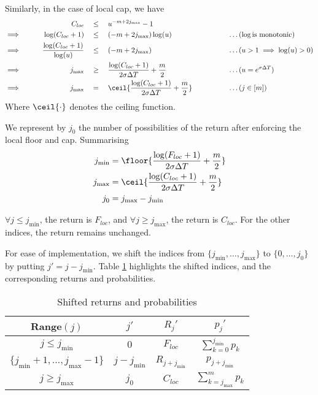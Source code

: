 Similarly, in the case of local cap, we have
\begin{alignat*}{9}
	                 &&  C_{loc}  \quad & \le \quad  u^{ -m + 2 j_{\max} } - 1 && \\
	\implies \qquad  &&  \log(C_{loc} + 1)  \quad & \le \quad  ( -m + 2 j_{\max} ) \log(u)  &&  \qquad \qquad \dots (\log \text{is monotonic}) \\
	\implies \qquad  &&  \frac{\log(C_{loc} + 1)}{\log(u)}  \quad & \le \quad  ( -m + 2 j_{\max} )  &&  \qquad \qquad \dots (u > 1 \implies \log(u) > 0) \\
	\implies \qquad  &&  j_{\max}  \quad & \ge \quad  \frac{ \log(C_{loc} + 1) }{ 2 \sigma \Delta T } + \frac{m}{2}  &&  \qquad \qquad \dots (u = e^{ \sigma \Delta T }) \\
	\implies \qquad  &&  j_{\max}  \quad & = \quad  \ceil{ \frac{ \log(C_{loc} + 1) }{ 2 \sigma \Delta T } + \frac{m}{2} }  &&  \qquad \qquad \dots (j \in [m]) \\
\end{alignat*}
Where $ \ceil{\cdot} $ denotes the ceiling function.

We represent by $ j_0 $ the number of possibilities of the return after enforcing the local floor and cap. Summarising
\begin{subequations}
	\label{eq:sp-clq-j-mix-max}
	\begin{align}
		j_{\min} &= \floor{ \frac{ \log(F_{loc} + 1) }{ 2 \sigma \Delta T } + \frac{m}{2} }  \\
		j_{\max} &= \ceil { \frac{ \log(C_{loc} + 1) }{ 2 \sigma \Delta T } + \frac{m}{2} }  \\
		j_0 &= j_{\max} - j_{\min}
	\end{align}
\end{subequations}

$ \forall j \le j_{\min} $, the return is $ F_{loc} $, and $ \forall j \ge j_{\max} $, the return is $ C_{loc} $. For the other indices, the return remains unchanged.

For ease of implementation, we shift the indices from $ \{ j_{\min}, \dots, j_{\max} \} $ to $ \{ 0, \dots, j_0 \} $ by putting $ j' = j - j_{\min} $. Table \ref{tab:sp-clq-shift} highlights the shifted indices, and the corresponding returns and probabilities.
\begin{table}[h]
	\label{tab:sp-clq-shift}
	\centering
	\caption{Shifted returns and probabilities}
	\begin{tabular}{cccc}
		\toprule
		Range$(j)$  &  $ j' $  &  $ R_j' $  &  $ p_j' $  \\
		\midrule
		$ j \le j_{\min} $  &  $ 0 $  &  $ F_{loc} $  &  $ \sum_{k=0}^{j_{\min}} p_k $  \\
		$ \{ j_{\min} + 1, \dots, j_{\max} - 1 \} $  &  $ j - j_{\min} $ &  $ R_{j + j_{\min}} $  &  $ p_{j + j_{\min}} $  \\
		$ j \ge j_{\max} $  &  $ j_0 $  &  $ C_{loc} $  &  $ \sum_{k=j_{\max}}^{m} p_k $  \\
		\bottomrule
	\end{tabular}
\end{table}


